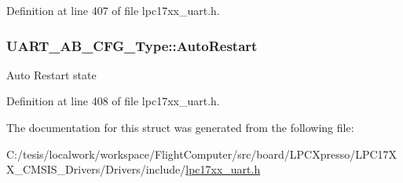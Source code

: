 \-Definition at line 407 of file lpc17xx\-\_\-uart.\-h.

\hypertarget{struct_u_a_r_t___a_b___c_f_g___type_acd37001da8b70352858651e359dbbd65}{
\subsubsection[{\-Auto\-Restart}]{ {\bf \-U\-A\-R\-T\-\_\-\-A\-B\-\_\-\-C\-F\-G\-\_\-\-Type\-::\-Auto\-Restart}}}\label{struct_u_a_r_t___a_b___c_f_g___type_acd37001da8b70352858651e359dbbd65}
\-Auto \-Restart state 

\-Definition at line 408 of file lpc17xx\-\_\-uart.\-h.



\-The documentation for this struct was generated from the following file\-:\begin{DoxyCompactItemize}
\item 
\-C\-:/tesis/localwork/workspace/\-Flight\-Computer/src/board/\-L\-P\-C\-Xpresso/\-L\-P\-C17\-X\-X\-\_\-\-C\-M\-S\-I\-S\-\_\-\-Drivers/\-Drivers/include/\hyperlink{lpc17xx__uart_8h}{lpc17xx\-\_\-uart.\-h}\end{DoxyCompactItemize}
